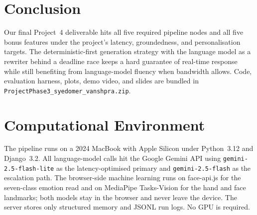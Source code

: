\documentclass[10pt,letterpaper]{article}
\begin{document}
\section{Conclusion}
Our final Project~4 deliverable hits all five required pipeline nodes
and all five bonus features under the project's latency,
groundedness, and personalisation targets. The deterministic-first
generation strategy with the language model as a rewriter behind a
deadline race keeps a hard guarantee of real-time response while
still benefiting from language-model fluency when bandwidth allows.
Code, evaluation harness, plots, demo video, and slides are bundled
in \texttt{ProjectPhase3\_syedomer\_vanshpra.zip}.

\section{Computational Environment}
The pipeline runs on a 2024 MacBook with Apple Silicon under
Python~3.12 and Django~3.2. All language-model calls hit the Google
Gemini API using \texttt{gemini-2.5-flash-lite} as the
latency-optimised primary and \texttt{gemini-2.5-flash} as the
escalation path. The browser-side machine learning runs on
face-api.js for the seven-class emotion read and on MediaPipe
Tasks-Vision for the hand and face landmarks; both models stay in
the browser and never leave the device. The server stores only
structured memory and JSONL run logs. No GPU is required.
\end{document}
